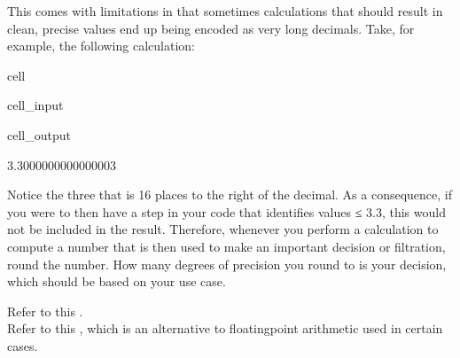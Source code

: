 \documentclass[letterpaper,10pt,english]{sphinxmanual}
\begin{document}
\sphinxAtStartPar
This comes with limitations in that sometimes calculations that should result in clean, precise values end up being encoded as very long decimals. Take, for example, the following calculation:

\begin{sphinxuseclass}{cell}
\begin{sphinxuseclass}{cell_input}
\begin{sphinxVerbatim}[commandchars=\\\{\}]
  
\end{sphinxVerbatim}

\end{sphinxuseclass}
\begin{sphinxuseclass}{cell_output}
\begin{sphinxVerbatim}[commandchars=\\\{\}]
3.3000000000000003
\end{sphinxVerbatim}

\end{sphinxuseclass}
\end{sphinxuseclass}
\sphinxAtStartPar
Notice the three that is 16 places to the right of the decimal. As a consequence, if you were to then have a step in your code that identifies values ≤ 3.3, this would not be included in the result. Therefore, whenever you perform a calculation to compute a number that is then used to make an important decision or filtration, round the number. How many degrees of precision you round to is your decision, which should be based on your use case.

\sphinxAtStartPar
Refer to this .\\
Refer to this , which is an alternative to floating\sphinxhyphen{}point arithmetic used in certain cases.
\end{document}
